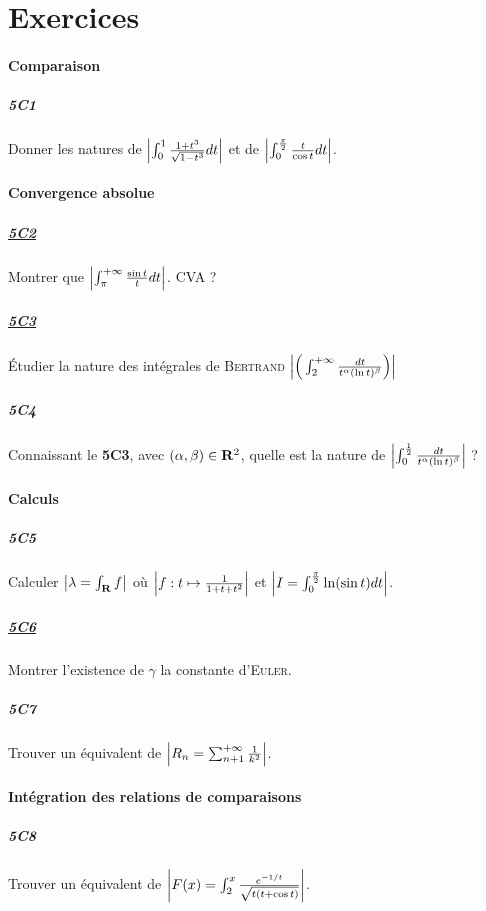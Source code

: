		
\section*{Exercices}
	\paragraph*{Comparaison}
		\subparagraph{5C1} Donner les natures de $\left\vert \int_0^1 \frac{1+t^3}{\sqrt{1-t^3}} dt  \right\vert $ et de $\left\vert \int_0^{\frac{\pi}{2}} \frac{t}
			{\cos t} dt \right\vert $.
	\paragraph*{Convergence absolue}
		\subparagraph{\uline{5C2}} Montrer que $\left\vert \int_{\pi}^{+\infty} \frac{\sin t}{t} dt  \right\vert $. CVA ?
		\subparagraph{\uline{5C3}} Étudier la nature des intégrales de \textsc{Bertrand} $\left\vert \Big( \int_2^{+\infty} \frac{dt}{t^{\alpha}(\ln t)^{\beta}} \Big)  \right\vert$
		\subparagraph{5C4} Connaissant le \textbf{5C3}, avec $(\alpha,\beta)\in{\mathbf{R}}^2$, quelle est la nature de $\left\vert \int_0^{\frac{1}{2}} 
			\frac{dt}{t^{\alpha}(\ln t)^{\beta}}  \right\vert$ ?
	\paragraph*{Calculs}
		\subparagraph{5C5} Calculer $\left\vert  \lambda = \int_{\mathbf{R}} f \right\vert$ où $\left\vert  f : t\mapsto \frac{1}{1+t+t^2}  \right\vert$ et $\left\vert  I = \int_0^{\frac{\pi}{2}} 
			\ln (\sin t ) dt  \right\vert$.
		\subparagraph{\uline{5C6}} Montrer l'existence de $\gamma$ la constante d'\textsc{Euler}.
		\subparagraph{5C7} Trouver un équivalent de $\left\vert  R_n = \sum_{n+1}^{+\infty} \frac{1}{k^2}  \right\vert $.
	\paragraph*{Intégration des relations de comparaisons}
		\subparagraph{5C8} Trouver un équivalent de $\left\vert  F(x) = \int_2^x \frac{e^{-1/t}}{\sqrt{t(t+\cos t)}}  \right\vert$.
		
	\medskip
	
\fin

